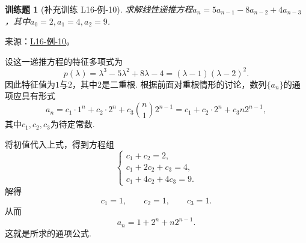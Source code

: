 \documentclass[12pt,fontset=fandol]{ctexart}
\newtheorem{exercise}{训练题}[section]
\begin{document}
\begin{exercise}[补充训练 L16-例-10]\label{prob:L16-例-10}
求解线性递推方程$a_n = 5a_{n - 1} - 8a_{n - 2} + 4a_{n - 3}$，其中$a_0 = 2, a_1 = 4, a_2 = 9$.
\end{exercise}
\noindent 来源：\href{https://github.com/yhwu-is/Linear-Algebra-Left-Undone/blob/new/%E8%AE%B2%E4%B9%89/%E4%B8%93%E9%A2%98/16%20%E8%8B%A5%E5%BD%93%E6%A0%87%E5%87%86%E5%BD%A2.tex}{L16-例-10}。
\begin{solve}
设这一递推方程的特征多项式为
    \[
        p(\lambda)=\lambda^3-5\lambda^2+8\lambda-4=(\lambda-1)(\lambda-2)^2.
    \]
    因此特征值为$1$与$2$，其中$2$是二重根. 根据前面对重根情形的讨论，数列$\{a_n\}$的通项应具有形式
    \[
        a_n=c_1\cdot 1^n+c_2\cdot 2^n+c_3\binom{n}{1}2^{n-1}
        =c_1+c_2\cdot 2^n+c_3n2^{n-1},
    \]
    其中$c_1,c_2,c_3$为待定常数.

    将初值代入上式，得到方程组
    \[
        \begin{cases}
            c_1+c_2=2, \\
            c_1+2c_2+c_3=4, \\
            c_1+4c_2+4c_3=9.
        \end{cases}
    \]
    解得
    \[
        c_1=1,\qquad c_2=1,\qquad c_3=1.
    \]
    从而
    \[
        a_n=1+2^n+n2^{n-1}.
    \]
    这就是所求的通项公式.
\end{solve}
\end{document}
